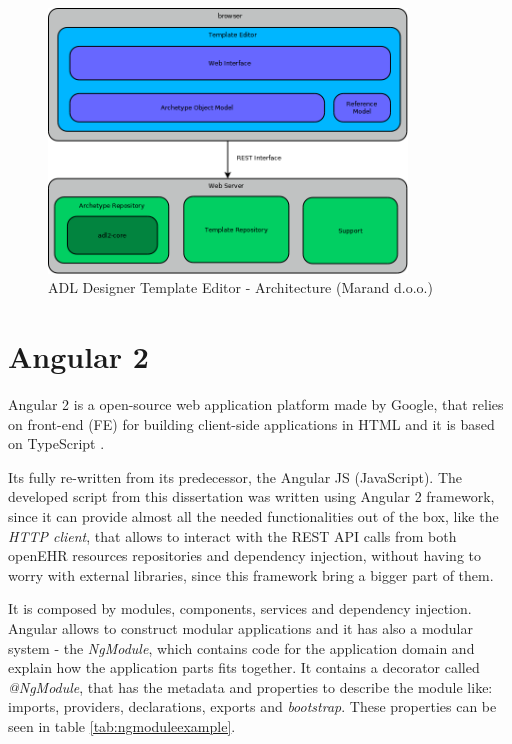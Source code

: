 \documentclass[mim_thesis.tex]{subfiles}
\begin{document}
\begin{figure}[H]
	\centering
    \includegraphics[width=0.85\textwidth]{img/template-editor-architecture.png}
	\caption{ADL Designer Template Editor - Architecture  (Marand d.o.o.)}
	\label{fig:templateEditorArchitecture}
\end{figure}

\section{Angular 2}
Angular 2 is a open-source web application platform made by Google, that relies on front-end (FE) for building client-side applications in \ac{HTML} and it is based on TypeScript \citep{angular}.

Its fully re-written from its predecessor, the Angular JS (JavaScript). The developed script from this dissertation was written using Angular 2 framework, since it can provide almost all the needed functionalities out of the box, like the \textit{HTTP client}, that allows to interact with the REST API calls from both openEHR resources repositories and dependency injection, without having to worry with external libraries, since this framework bring a bigger part of them.

It is composed by modules, components, services and dependency injection. 
Angular allows to construct modular applications and it has also a modular system - the \textit{NgModule}, which contains code for the application domain and explain how the application parts fits together. It contains a decorator called \textit{@NgModule}, that has the metadata and properties to describe the module like: imports, providers, declarations, exports and \textit{bootstrap}. These properties can be seen in table \ref{tab:ngmoduleexample}. 
\end{document}

